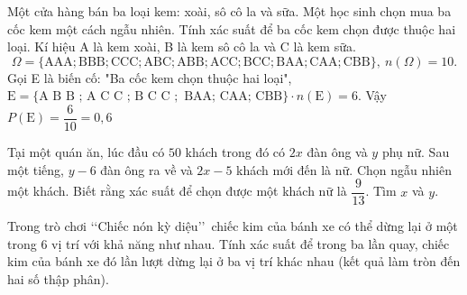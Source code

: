 \begin{bt}%
	Một cửa hàng bán ba loại kem: xoài, sô cô la và sữa. Một học sinh chọn mua ba cốc kem một cách ngẫu nhiên. Tính xác suất để ba cốc kem chọn được thuộc hai loại.
	\loigiai
	{
		Kí hiệu A là kem xoài, B là kem sô cô la và C là kem sữa.	
		\[\Omega=\{\mathrm{AAA} ; \mathrm{BBB} ; \mathrm{CCC} ; \mathrm{ABC} ; \mathrm{ABB} ; \mathrm{ACC} ; \mathrm{BCC} ; \mathrm{BAA} ; \mathrm{CAA} ; \mathrm{CBB}\},~ n(\Omega)=10.\]
		Gọi E là biến cố: "Ba cốc kem chọn thuộc hai loại", $\mathrm {E}=\{\text{A B B ; A C C ; B C C }; \text { BAA; CAA; } \mathrm{CBB}\}\cdot n(\mathrm{E})=6$. Vậy $P\mathrm{(E)}=\dfrac{6}{10}=0{,}6$
	}	
\end{bt}

\begin{bt}%
	Tại một quán ăn, lúc đầu có $50$ khách trong đó có $2 x$ đàn ông và $y$ phụ nữ. Sau một tiếng, $y-6$ đàn ông ra về và $2 x-5$ khách mới đến là nữ. Chọn ngẫu nhiên một khách. Biết rằng xác suất để chọn được một khách nữ là $\dfrac{9}{13}$. Tìm $x$ và $y$.
\end{bt}

\begin{bt}%
Trong trò chơi \lq\lq Chiếc nón kỳ diệu\rq\rq\ chiếc kim của bánh xe có thể dừng lại ở một trong $6$ vị trí với khả năng như nhau. Tính xác suất để trong ba lần quay, chiếc kim của bánh xe đó lần lượt dừng lại ở ba vị trí khác nhau (kết quả làm tròn đến hai số thập phân).
\end{bt}

